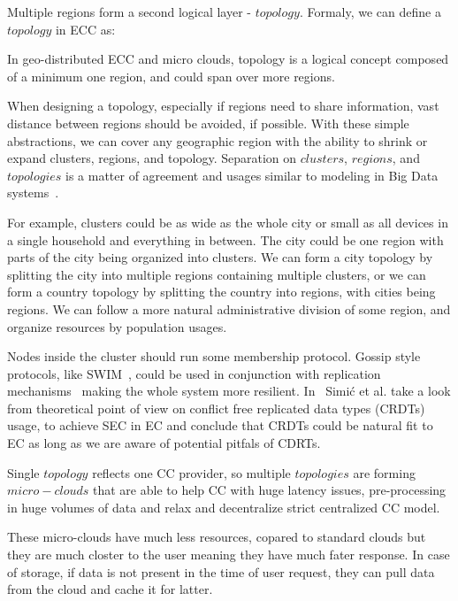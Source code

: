 Multiple regions form a second logical layer - $topology$. Formaly, we can define a $topology$ in ECC as:

\begin{definition}
In geo-distributed ECC and micro clouds, topology is a logical concept composed of a minimum one region, and could span over more regions. 
\end{definition}

When designing a topology, especially if regions need to share information, vast distance between regions should be avoided, if possible. With these simple abstractions, we can cover any geographic region with the ability to shrink or expand clusters, regions, and topology. Separation on $clusters$, $regions$, and $topologies$ is a matter of agreement and usages similar to modeling in Big Data systems~\cite{SonbolOAA20, WangCAL14}. 

For example, clusters could be as wide as the whole city or small as all devices in a single household and everything in between. The city could be one region with parts of the city being organized into clusters. We can form a city topology by splitting the city into multiple regions containing multiple clusters, or we can form a country topology by splitting the country into regions, with cities being regions. We can follow a more natural administrative division of some region, and organize resources by population usages.

Nodes inside the cluster should run some membership protocol. Gossip style protocols, like SWIM~\cite{DasGM02}, could be used in conjunction with replication mechanisms~\cite{LiBCL20, CauCBFCEB16,CRDTS_Nuno} making the whole system more resilient. In~\cite{inproceedingsSimic2} Simi\' c et al. take a look from theoretical point of view on conflict free replicated data types (CRDTs) usage, to achieve SEC in EC and conclude that CRDTs could be natural fit to EC as long as we are aware of potential pitfals of CDRTs.

Single $topology$ reflects one CC provider, so multiple $topologies$ are forming $micro-clouds$ that are able to help CC with huge latency issues, pre-processing in huge volumes of data and relax and decentralize strict centralized CC model.

These micro-clouds have much less resources, copared to standard clouds but they are much closter to the user meaning they have much fater response. In case of storage, if data is not present in the time of user request, they can pull data from the cloud and cache it for latter.

